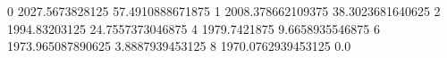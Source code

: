 0 2027.5673828125 57.4910888671875
1 2008.378662109375 38.3023681640625
2 1994.83203125 24.7557373046875
4 1979.7421875 9.6658935546875
6 1973.965087890625 3.8887939453125
8 1970.0762939453125 0.0
